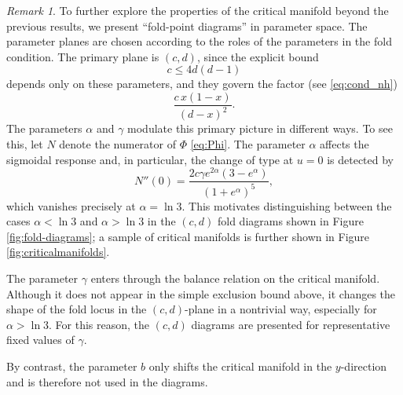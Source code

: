\documentclass[3p]{elsarticle}
\theoremstyle{plain}
\theoremstyle{remark}
\newtheorem{remark}{Remark}
\theoremstyle{definition}
\begin{document}
\begin{remark}\label{rem:parameter_planes}
To further explore the properties of the critical manifold beyond the previous results, we present ``fold-point diagrams'' in parameter space. The parameter planes are chosen according to the roles of the parameters in the fold condition. The primary plane is $(c,d)$, since the explicit bound
\[
c\le 4d(d-1)
\]
depends only on these parameters, and they govern the factor (see \eqref{eq:cond_nh})
\[
\frac{c\,x(1-x)}{(d-x)^2}.
\]
The parameters $\alpha$ and $\gamma$ modulate this primary picture in different ways. To see this, let $N$ denote the numerator of $\Phi$ \eqref{eq:Phi}. The parameter $\alpha$ affects the sigmoidal response and, in particular, the change of type at $u=0$ is detected by
\[
N''(0)=\frac{2c\gamma e^{2\alpha}(3-e^\alpha)}{(1+e^\alpha)^5},
\]
which vanishes precisely at $\alpha=\ln 3$. This motivates distinguishing between the cases $\alpha<\ln 3$ and $\alpha>\ln 3$ in the $(c,d)$ fold diagrams shown in Figure \ref{fig:fold-diagrams}; a sample of critical manifolds is further shown in Figure \ref{fig:criticalmanifolds}.

The parameter $\gamma$ enters through the balance relation on the critical manifold. Although it does not appear in the simple exclusion bound above, it changes the shape of the fold locus in the $(c,d)$-plane in a nontrivial way, especially for $\alpha>\ln 3$. For this reason, the $(c,d)$ diagrams are presented for representative fixed values of $\gamma$.

By contrast, the parameter $b$ only shifts the critical manifold in the $y$-direction and is therefore not used in the diagrams.
\end{remark}
\end{document}
